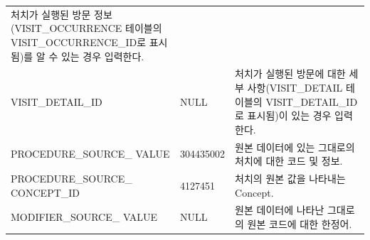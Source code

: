 \documentclass[11pt]{book}
\theoremstyle{definition}
\theoremstyle{definition}
\theoremstyle{definition}
\theoremstyle{remark}
\begin{document}
\begin{longtable}[]{@{}lll@{}}
\begin{minipage}[t]{0.48\columnwidth}
처치가 실행된 방문 정보(VISIT\_OCCURRENCE 테이블의
VISIT\_OCCURRENCE\_ID로 표시됨)를 알 수 있는 경우 입력한다.\strut
\end{minipage}\tabularnewline
\begin{minipage}[t]{0.28\columnwidth}\raggedright\strut
VISIT\_DETAIL\_ID\strut
\end{minipage} & \begin{minipage}[t]{0.16\columnwidth}\raggedright\strut
NULL\strut
\end{minipage} & \begin{minipage}[t]{0.48\columnwidth}\raggedright\strut
처치가 실행된 방문에 대한 세부 사항(VISIT\_DETAIL 테이블의
VISIT\_DETAIL\_ID로 표시됨)이 있는 경우 입력한다.\strut
\end{minipage}\tabularnewline
\begin{minipage}[t]{0.28\columnwidth}\raggedright\strut
PROCEDURE\_SOURCE\_ VALUE\strut
\end{minipage} & \begin{minipage}[t]{0.16\columnwidth}\raggedright\strut
304435002\strut
\end{minipage} & \begin{minipage}[t]{0.48\columnwidth}\raggedright\strut
원본 데이터에 있는 그대로의 처치에 대한 코드 및 정보.\strut
\end{minipage}\tabularnewline
\begin{minipage}[t]{0.28\columnwidth}\raggedright\strut
PROCEDURE\_SOURCE\_ CONCEPT\_ID\strut
\end{minipage} & \begin{minipage}[t]{0.16\columnwidth}\raggedright\strut
4127451\strut
\end{minipage} & \begin{minipage}[t]{0.48\columnwidth}\raggedright\strut
처치의 원본 값을 나타내는 Concept.\strut
\end{minipage}\tabularnewline
\begin{minipage}[t]{0.28\columnwidth}\raggedright\strut
MODIFIER\_SOURCE\_ VALUE\strut
\end{minipage} & \begin{minipage}[t]{0.16\columnwidth}\raggedright\strut
NULL\strut
\end{minipage} & \begin{minipage}[t]{0.48\columnwidth}\raggedright\strut
원본 데이터에 나타난 그대로의 원본 코드에 대한 한정어.\strut
\end{minipage}\tabularnewline
\bottomrule
\end{longtable}
\end{document}
